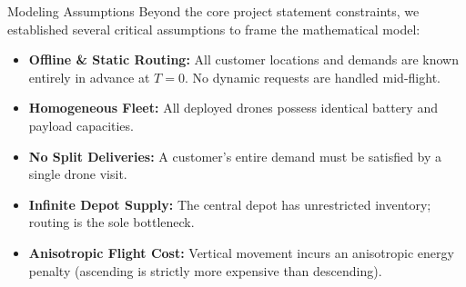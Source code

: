 \documentclass[11pt,aspectratio=169]{beamer}
\begin{document}
\begin{frame}{Modeling Assumptions}
    Beyond the core project statement constraints, we established several critical assumptions to frame the mathematical model:

    \vspace{0.3cm}
    \begin{itemize}
        \item \textbf{Offline \& Static Routing:} All customer locations and demands are known entirely in advance at $T=0$. No dynamic requests are handled mid-flight.
        \item \textbf{Homogeneous Fleet:} All deployed drones possess identical battery and payload capacities.
        \item \textbf{No Split Deliveries:} A customer's entire demand must be satisfied by a single drone visit.
        \item \textbf{Infinite Depot Supply:} The central depot has unrestricted inventory; routing is the sole bottleneck.
        \item \textbf{Anisotropic Flight Cost:} Vertical movement incurs an anisotropic energy penalty (ascending is strictly more expensive than descending).
    \end{itemize}
\end{frame}
\end{document}
